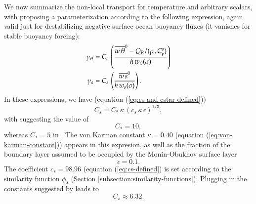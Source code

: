 We now summarize the non-local transport for temperature and arbitrary
scalars, with \cite{LargeKPP} proposing a parameterization according
to the following expression, again valid just for destabilizing
negative surface ocean buoyancy fluxes (it vanishes for stable
buoyancy forcing):
\begin{align}
 \gamma_{\theta} &= 
   C_{s} \, \left( \frac{ \overline{w \, \theta}^{0} - Q_{R}/(\rho_{o} \, C_{\mbox{\tiny p}}^{o} )  }{h \,  w_{\theta}(\sigma)}  
            \right) 
\label{eq:non-local-temp-kpp-again}
\\
 \gamma_{s} &= 
   C_{s} \, \left( \frac{ \overline{w \, s}^{0} }{h \,  w_{s}(\sigma)}  
            \right).
\label{eq:non-local-scalar-kpp-again}
\end{align}
In these expressions, we have (equation
(\ref{eq:cs-and-cstar-defined}))
\begin{equation}
 C_{s} = C_{*} \, \kappa \, (c_{s} \, \kappa \, \epsilon)^{1/3},  
\end{equation}
with \cite{LargeKPP} suggesting the value of 
\begin{equation}
 C_{*} = 10,
\end{equation}
whereas $C_{*} = 5$ in \cite{Smyth_etal2002}.  The von Karman constant
$\kappa = 0.40$ (equation (\ref{eq:von-karman-constant})) appears in
this expresion, as well as the fraction of the boundary layer assumed
to be occupied by the Monin-Obukhov surface layer
\begin{equation}
\epsilon = 0.1.
\end{equation}
The coefficient $c_{s} = 98.96$ (equation (\ref{eq:cs-defined}) is set
according to the similarity function $\phi_{s}$ (Section
\ref{subsection:similarity-functions}).  Plugging in the constants
suggested by \cite{LargeKPP} leads to
\begin{equation}
 C_{s} \approx 6.32. 
\label{eq:Cs-value}
\end{equation}

